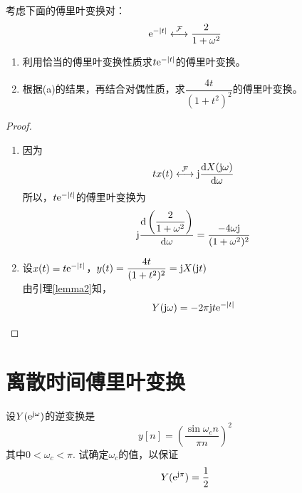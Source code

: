 \begin{proposition}

    考虑下面的傅里叶变换对：
    $$\mathrm{e}^{-|t|} \stackrel{\mathcal{F}}{\longleftrightarrow} \dfrac{2}{1 + \omega^2}$$

    \begin{enumerate}

        \item 利用恰当的傅里叶变换性质求$t\mathrm{e}^{-|t|}$的傅里叶变换。
        \item 根据\textup{(a)}的结果，再结合对偶性质，求$\dfrac{4t}{(1+t^2)^2}$的傅里叶变换。

    \end{enumerate}

\end{proposition}

\begin{proof}

    \begin{enumerate}

        \item 
            因为
            $$tx(t) \stackrel{\mathcal{F}}{\longleftrightarrow} \mathrm{j} \dfrac{\mathrm{d} X(\mathrm{j} \omega)}{\mathrm{d} \omega}$$
            所以，$t\mathrm{e}^{-|t|}$的傅里叶变换为
            $$\mathrm{j} \dfrac{\mathrm{d} \left( \dfrac{2}{1 + \omega^2} \right)}{\mathrm{d} \omega} = \dfrac{-4\omega \mathrm{j}}{(1 + \omega^2)^2}$$
        \item 
            设$x(t) = t\mathrm{e}^{-|t|}$，$y(t) = \dfrac{4t}{(1+t^2)^2} = \mathrm{j} X(\mathrm{j} t)$\\
            由引理\ref{lemma2}知，
            $$Y(\mathrm{j} \omega) = -2 \pi \mathrm{j} t \mathrm{e}^{-|t|}$$

    \end{enumerate}

\end{proof}

\section{离散时间傅里叶变换}

\begin{proposition}
    
    设$Y(\mathrm{e}^{\mathrm{j} \omega})$的逆变换是
    $$y[n] = \left(\dfrac{\sin{\omega_c n}}{\pi n}\right)^2$$
    其中$0 < \omega_c < \pi$. 试确定$\omega_c$的值，以保证
    $$Y(\mathrm{e}^{\mathrm{j} \pi}) = \dfrac{1}{2}$$

\end{proposition}

